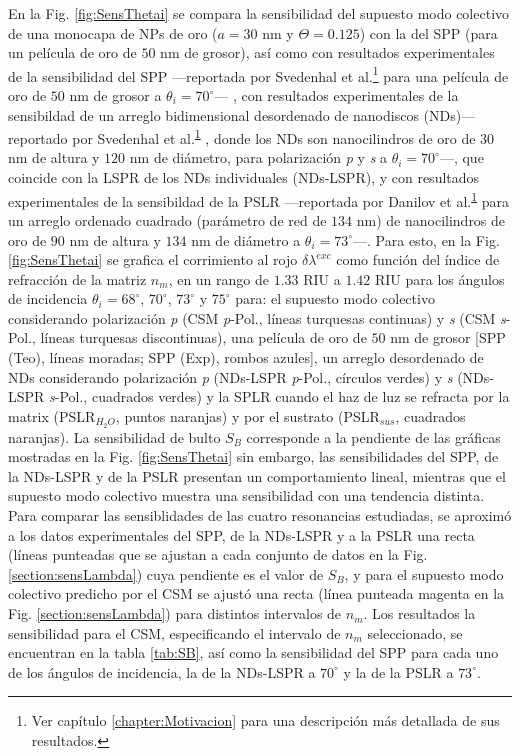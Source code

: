 En la Fig. \ref{fig:SensThetai} se compara la sensibilidad del supuesto modo colectivo de una monocapa de NPs de oro ($a=30$ nm y $\Theta=0.125$) con la del SPP (para un película de oro de $50$ nm de grosor), así como con resultados experimentales de la sensibilidad del SPP ---reportada por  Svedenhal et al.\footnote{\label{fn:Motivacion}Ver capítulo \ref{chapter:Motivacion} para una descripción más detallada de sus resultados.} \cite{svedendahl2009refractometric} para una película de oro de $50$ nm de grosor a $\theta_i = 70^\circ$--- , con resultados experimentales de la sensibildad de un  arreglo bidimensional desordenado de nanodiscos (NDs)---reportado por Svedenhal et al.\textsuperscript{\ref{fn:Motivacion}}  \cite{svedendahl2009refractometric}, donde los NDs son nanocilindros de oro de $30$ nm de altura y $120$ nm de diámetro, para polarización \emph{p} y \emph{s} a $\theta_i = 70^\circ$---, que coincide con la LSPR de los NDs individuales (NDs-LSPR), y con resultados experimentales de la sensibildad de la PSLR ---reportada por Danilov et al.\textsuperscript{\ref{fn:Motivacion}} \cite{danilov2018ultra} para un arreglo ordenado cuadrado (parámetro de red de $134$ nm) de nanocilindros de oro de $90$ nm de altura y $134$ nm de diámetro a $\theta_i= 73^\circ$---. Para esto, en la Fig. \ref{fig:SensThetai} se grafica el corrimiento al rojo $\delta\lambda^{exc}$ como función del índice de refracción de la matriz $n_m$, en un rango de $1.33$ RIU a $1.42$ RIU para los ángulos de incidencia $\theta_i = 68^\circ$, $70^\circ$, $73^\circ$ y $75^\circ$ para: el supuesto modo colectivo considerando polarización \emph{p} (CSM \textit{p}-Pol., líneas turquesas continuas) y \emph{s} (CSM \textit{s}-Pol., líneas turquesas discontinuas), una película de oro de $50$ nm de grosor [SPP (Teo), líneas moradas; SPP (Exp), rombos azules], un arreglo desordenado de NDs  considerando polarización \emph{p} (NDs-LSPR \textit{p}-Pol., círculos verdes) y \emph{s} (NDs-LSPR \textit{s}-Pol., cuadrados verdes) y la SPLR cuando el haz de luz se refracta por la matrix (PSLR$_{H_{2}O}$, puntos naranjas) y por el sustrato (PSLR$_{sus}$, cuadrados naranjas). La sensibilidad de bulto $S_B$ corresponde a la pendiente de las gráficas mostradas en la Fig. \ref{fig:SensThetai} sin embargo, las sensibilidades del SPP, de la NDs-LSPR y de la PSLR presentan un comportamiento lineal, mientras que el supuesto modo colectivo muestra una sensibilidad con una tendencia distinta. Para comparar las sensiblidades de las cuatro resonancias estudiadas, se aproximó a los datos experimentales del SPP, de la NDs-LSPR y a la PSLR una recta (líneas punteadas que se ajustan a cada conjunto de datos en la Fig. \ref{section:sensLambda}) cuya pendiente es el valor de $S_B$, y para el supuesto modo colectivo predicho por el CSM se ajustó una recta (línea punteada magenta en la Fig. \ref{section:sensLambda}) para distintos intervalos de $n_m$. Los resultados la sensibilidad para el CSM, especificando el  intervalo de $n_m$ seleccionado, se  encuentran en la tabla \ref{tab:SB}, así como la sensibilidad del SPP para cada uno de los ángulos de incidencia, la de la NDs-LSPR a $70^\circ$ y la de la PSLR a $73^\circ$.


